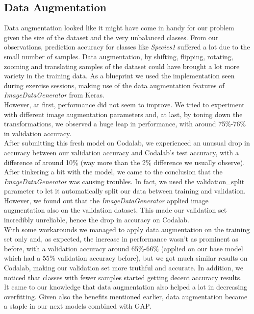 \documentclass[11pt]{report}
\begin{document}
\subsection{Data Augmentation}
Data augmentation looked like it might have come in handy for our problem given the size of the dataset and the very unbalanced classes. From our observations, prediction accuracy for classes like \textit{Species1} suffered a lot due to the small number of samples. Data augmentation, by shifting, flipping, rotating, zooming and translating samples of the dataset could have brought a lot more variety in the training data. As a blueprint we used the implementation seen during exercise sessions, making use of the data augmentation features of \textit{ImageDataGenerator} from Keras. \\
However, at first, performance did not seem to improve. We tried to experiment with different image augmentation parameters and, at last, by toning down the transformations, we observed a huge leap in performance, with around 75\%-76\% in validation accuracy. \\
After submitting this fresh model on Codalab, we experienced an unusual drop in accuracy between our validation accuracy and Codalab's test accuracy, with a difference of around 10\% (way more than the 2\% difference we usually observe). After tinkering a bit with the model, we came to the conclusion that the \textit{ImageDataGenerator} was causing troubles. In fact, we used the validation\_split parameter to let it automatically split our data between training and validation. However, we found out that the \textit{ImageDataGenerator} applied image augmentation also on the validation dataset. This made our validation set incredibly unreliable, hence the drop in accuracy on Codalab. \\
With some workarounds we managed to apply data augmentation on the training set only and, as expected, the increase in performance wasn't as prominent as before, with a validation accuracy around 65\%-66\% (applied on our base model which had a 55\% validation accuracy before), but we got much similar results on Codalab, making our validation set more truthful and accurate. In addition, we noticed that classes with fewer samples started getting decent accuracy results. \\
It came to our knowledge that data augmentation also helped a lot in decreasing overfitting. Given also the benefits mentioned earlier, data augmentation became a staple in our next models combined with GAP.
\end{document}

